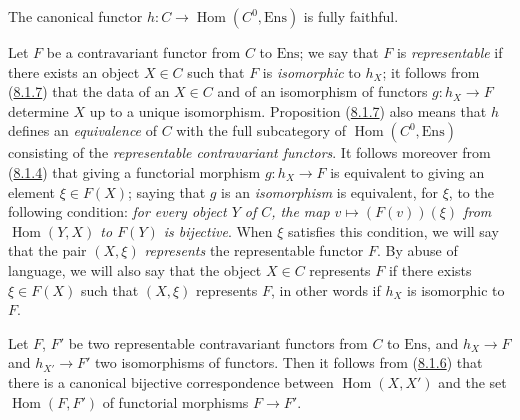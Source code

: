 \begin{proposition}[8.1.7]
\label{0.8.1.7}
The canonical functor
$h:C\to\operatorname{Hom}(C^0,\mathrm{Ens})$ is fully faithful.
\end{proposition}

\begin{env}[8.1.8]
\label{0.8.1.8}
Let $F$ be a contravariant functor from $C$ to $\mathrm{Ens}$; we say that
$F$ is \emph{representable} if there exists an object $X\in C$ such that $F$
is \emph{isomorphic} to $h_X$; it follows from
(\hyperref[0.8.1.7]{8.1.7}) that the data of an $X\in C$ and of an
isomorphism of functors $g:h_X\to F$ determine $X$ up to a unique
isomorphism. Proposition (\hyperref[0.8.1.7]{8.1.7}) also means that $h$
defines an \emph{equivalence} of $C$ with the full subcategory of
$\operatorname{Hom}(C^0,\mathrm{Ens})$ consisting of the \emph{representable
contravariant functors}. It follows moreover from
(\hyperref[0.8.1.4]{8.1.4}) that giving a functorial morphism
$g:h_X\to F$ is equivalent to giving an element $\xi\in F(X)$; saying that
$g$ is an \emph{isomorphism} is equivalent, for $\xi$, to the following
condition: \emph{for every object $Y$ of $C$, the map
$v\mapsto(F(v))(\xi)$ from $\operatorname{Hom}(Y,X)$ to $F(Y)$ is
bijective}. When $\xi$ satisfies this condition, we will say that the pair
$(X,\xi)$ \emph{represents} the representable functor $F$. By abuse of
language, we will also say that the object $X\in C$ represents $F$ if there
exists $\xi\in F(X)$ such that $(X,\xi)$ represents $F$, in other words if
$h_X$ is isomorphic to $F$.

Let $F$, $F'$ be two representable contravariant functors from $C$ to
$\mathrm{Ens}$, and $h_X\to F$ and $h_{X'}\to F'$ two isomorphisms of
functors. Then it follows from (\hyperref[0.8.1.6]{8.1.6}) that there is a
canonical bijective correspondence between $\operatorname{Hom}(X,X')$ and
the set $\operatorname{Hom}(F,F')$ of functorial morphisms $F\to F'$.
\end{env}

